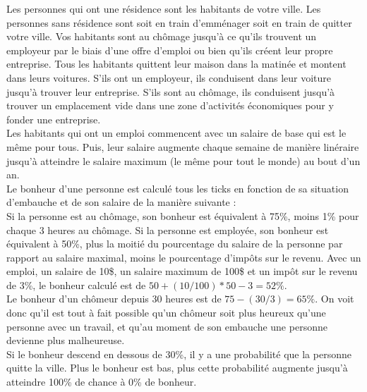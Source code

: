 \documentclass[11pt]{report}
\begin{document}
Les personnes qui ont une résidence sont les habitants de votre ville. Les personnes sans résidence sont soit en train d'emménager soit en train de quitter votre ville.
Vos habitants sont au chômage jusqu'à ce qu'ils trouvent un employeur par le biais d'une offre d'emploi ou bien qu'ils créent leur propre entreprise.
Tous les habitants quittent leur maison dans la matinée et montent dans leurs voitures. S'ils ont un employeur, ils conduisent dans leur voiture jusqu'à trouver leur entreprise. S'ils sont au chômage, ils conduisent jusqu'à trouver un emplacement vide dans une zone d'activités économiques pour y fonder une entreprise.\\
Les habitants qui ont un emploi commencent avec un salaire de base qui est le même pour tous. Puis, leur salaire augmente chaque semaine de manière linéraire jusqu'à atteindre le salaire maximum (le même pour tout le monde) au bout d'un an.\\
Le bonheur d'une personne est calculé tous les ticks en fonction de sa situation d'embauche et de son salaire de la manière suivante :\\
Si la personne est au chômage, son bonheur est équivalent à 75\%, moins 1\% pour chaque 3 heures au chômage.
Si la personne est employée, son bonheur est équivalent à 50\%, plus la moitié du pourcentage du salaire de la personne par rapport au salaire maximal, moins le pourcentage d'impôts sur le revenu.
Avec un emploi, un salaire de 10\$, un salaire maximum de 100\$ et un impôt sur le revenu de 3\%, le bonheur calculé est de $50 + (10 / 100) * 50 - 3 = 52\%$.\\
Le bonheur d'un chômeur depuis 30 heures est de $75 - (30 / 3) = 65\%$.
On voit donc qu'il est tout à fait possible qu'un chômeur soit plus heureux qu'une personne avec un travail, et qu'au moment de son embauche une personne devienne plus malheureuse.\\
Si le bonheur descend en dessous de 30\%, il y a une probabilité que la personne quitte la ville. Plus le bonheur est bas, plus cette probabilité augmente jusqu'à atteindre 100\% de chance à 0\% de bonheur.



\newpage
\end{document}
